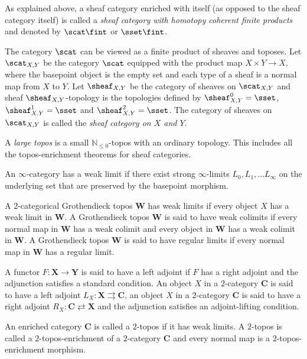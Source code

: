 \documentclass[a4paper,reqno,oneside]{article}
\begin{document}
As explained above, a sheaf category enriched with itself (as opposed to the sheaf category itself) is called a \textit{sheaf category with homotopy coherent finite products} and denoted by $\scat\fint$ or $\sset\fint$. 

The category $\scat$ can be viewed as a finite product of sheaves and toposes. Let $\scat_{X,Y}$ be the category $\scat$ equipped with the product map $X\times Y\to X$, where the basepoint object is the empty set and each type of a sheaf is a normal map from $X$ to $Y$. Let $\sheaf_{X,Y}$ be the category of sheaves on $\scat_{X,Y}$ and sheaf $\sheaf_{X,Y}$-topology is the topologies defined by $\sheaf_{X,Y}^0=\sset$, $\sheaf_{X,Y}^1=\sset$ and $\sheaf_{X,Y}^2=\sset$. The category of sheaves on $\scat_{X,Y}$ is called the \textit{sheaf category on $X$ and $Y$}. 

A \textit{large topos} is a small $\mathbb{N}_{\leq0}$-topos with an ordinary topology. This includes all the topos-enrichment theorems for sheaf categories.

An $\infty$-category has a weak limit if there exist strong $\infty$-limits $L_0,L_1,...L_\infty$ on the underlying set that are preserved by the basepoint morphism. 

A $2$-categorical Grothendieck topos $\mathbf{W}$ has weak limits if every object $X$ has a weak limit in $\mathbf{W}$. A Grothendieck topos $\mathbf{W}$ is said to have weak colimits if every normal map in $\mathbf{W}$ has a weak colimit and every object in $\mathbf{W}$ has a weak colimit in $\mathbf{W}$. A Grothendieck topos $\mathbf{W}$ is said to have regular limits if every normal map in $\mathbf{W}$ has a regular limit.

A functor $F:\mathbf{X}\to\mathbf{Y}$ is said to have a left adjoint if $F$ has a right adjoint and the adjunction satisfies a standard condition. An object $X$ in a $2$-category $\mathbf{C}$ is said to have a left adjoint $L_X:\mathbf{X}\rightrightarrows \mathbf{C}$, an object $X$ in a $2$-category $\mathbf{C}$ is said to have a right adjoint $R_X:\mathbf{C}\rightleftarrows \mathbf{X}$ and the adjunction satisfies an adjoint-lifting condition.


An enriched category $\mathbf{C}$ is called a $2$-topos if it has weak limits. A $2$-topos is called a $2$-topos-enrichment of a $2$-category $\mathbf{C}$ and every normal map is a $2$-topos-enrichment morphism. 
\end{document}
